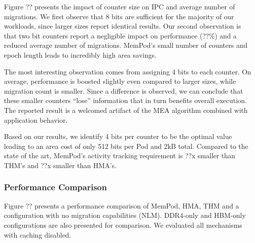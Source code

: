 Figure ?? presents the impact of counter size on IPC and average number of migrations. We first observe that 8 bits are sufficient for the majority of our workloads, since larger sizes report identical results. Our second observation is that two bit counters report a negligible impact on performance (??\%) and a reduced average number of migrations. MemPod's small number of counters and epoch length leads to incredibly high area savings.

The most interesting observation comes from assigning 4 bits to each counter. On average, performance is boosted slightly even compared to larger sizes, while migration count is smaller. Since a difference is observed, we can conclude that these smaller counters ``lose'' information that in turn benefits overall execution. The reported result is a welcomed artifact of the MEA algorithm combined with application behavior. 

Based on our results, we identify 4 bits per counter to be the optimal value leading to an area cost of only 512 bits per Pod and 2kB total. Compared to the state of the art, MemPod's activity tracking requirement is ??x smaller than THM's and ??x smaller than HMA's.


\subsubsection{Performance Comparison}
\label{sub:performance}

Figure ?? presents a performance comparison of MemPod, HMA, THM and a configuration with no migration capabilities (NLM). DDR4-only and HBM-only configurations are also presented for comparison. We evaluated all mechanisms with caching disabled. 


